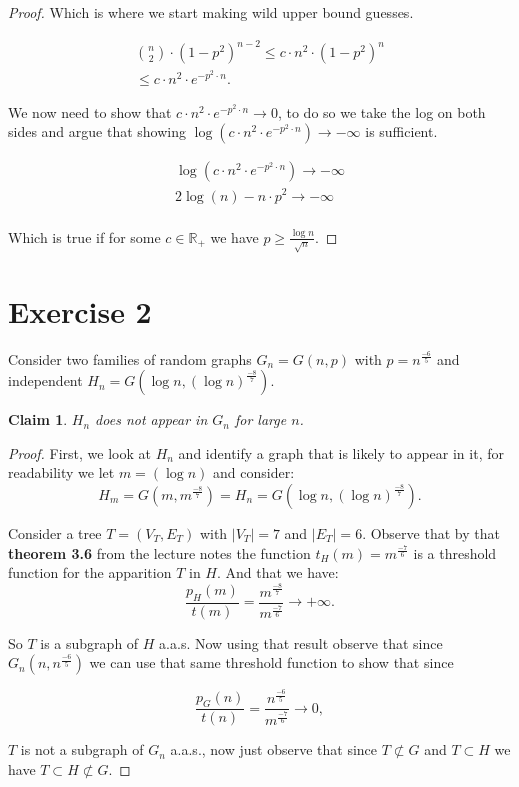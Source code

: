 \documentclass[11pt]{article}
\newtheorem{claim}{Claim}[section]
\begin{document}
\begin{proof}
    Which is where we start making wild upper bound guesses. 

    \begin{align*}
        \binom{n}{2} \cdot (1-p^2)^{n-2} \leq c \cdot n^2 \cdot (1-p^2)^{n} \\
        \leq c \cdot n^2 \cdot e^{-p^2 \cdot n}.
    \end{align*}

    We now need to show that $c \cdot n^2 \cdot e^{-p^2 \cdot n} \rightarrow 0$, to do so we take the log on both sides and argue that showing $\log \left(c \cdot n^2 \cdot e^{-p^2 \cdot n} \right) \rightarrow -\infty$ is sufficient. 

    \begin{align*}
        \log \left(c \cdot n^2 \cdot e^{-p^2\cdot n} \right) \rightarrow -\infty \\
        2 \log (n) - n \cdot p^2 \rightarrow -\infty \\
    \end{align*}

    Which is true if for some $c\in \mathbb{R}_+$ we have $p \geq \frac{\log n}{\sqrt{n}}$.
\end{proof}

\newpage

\section*{Exercise 2} Consider two families of random graphs $G_n = G(n,p)$ with $p = n^\frac{-6}{5}$ and independent $H_n = G(\log n, (\log n)^\frac{-8}{7})$. 

\begin{claim}
$H_n$ does not appear in $G_n$ for large $n$. 
\end{claim}

\begin{proof}
    First, we look at $H_n$ and identify a graph that is likely to appear in it, for readability we let $m  = (\log n)$ and consider:
    \[ H_m = G(m,m^\frac{-8}{7}) = H_n = G(\log n, (\log n)^\frac{-8}{7}).\]

    Consider a tree $T = (V_T,E_T)$ with $|V_T|=7$ and $|E_T|= 6$. Observe that by that \textbf{theorem 3.6} from the lecture notes the function $t_H(m) = m^\frac{-7}{6}$ is a threshold function for the apparition $T$ in $H$. And that we have: 
    \[ \frac{p_H(m)}{t(m) } = \frac{m^\frac{-8}{7}}{m^\frac{-7}{6}} \rightarrow + \infty. \]

    So $T$ is a subgraph of $H$ a.a.s. Now using that result observe that since $G_n(n,n^\frac{-6}{5})$ we can use that same threshold function to show that since 

    \[ \frac{p_G(n)}{t(n) } = \frac{n^\frac{-6}{5}}{m^\frac{-7}{6}} \rightarrow 0, \]

    $T$ is not a subgraph of $G_n$ a.a.s., now just observe that since $T \not \subset G$ and $T \subset H$ we have $T \subset H \not \subset G$.

\end{proof}
\end{document}

